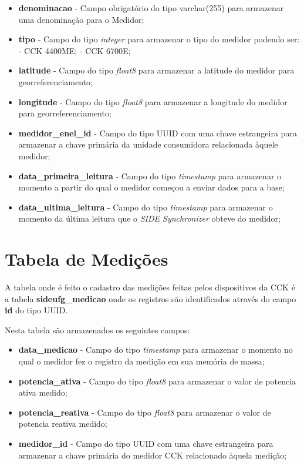 \begin{itemize}
    \item \textbf{denominacao} - Campo obrigatório do tipo varchar(255) para armazenar uma denominação para o Medidor;
    \item \textbf{tipo} - Campo do tipo \textit{integer} para armazenar o tipo do medidor podendo ser:
     - CCK 4400ME;
     - CCK 6700E;
    \item \textbf{latitude} - Campo do tipo \textit{float8} para armazenar a latitude do medidor para georreferenciamento;
    \item \textbf{longitude} - Campo do tipo \textit{float8} para armazenar a longitude do medidor para georreferenciamento;
    \item \textbf{medidor\_enel\_id} - Campo do tipo UUID com uma chave estrangeira para armazenar a chave primária da unidade consumidora relacionada àquele medidor;
    \item \textbf{data\_primeira\_leitura} - Campo do tipo \textit{timestamp} para armazenar o momento a partir do qual o medidor começou a enviar dados para a base;
    \item \textbf{data\_ultima\_leitura} - Campo do tipo \textit{timestamp} para armazenar o momento da última leitura que o \textit{SIDE Synchronizer} obteve do medidor;
    
\end{itemize}

\section{Tabela de Medições}

A tabela onde é feito o cadastro das medições feitas pelos dispositivos da CCK é a tabela \textbf{sideufg\_medicao} onde os registros são identificados através do campo \textbf{id} do tipo UUID.

Nesta tabela são armazenados os seguintes campos:

\begin{itemize}
    \item \textbf{data\_medicao} - Campo do tipo \textit{timestamp} para armazenar o momento no qual o medidor fez o registro da medição em sua memória de massa;
    \item \textbf{potencia\_ativa} - Campo do tipo \textit{float8} para armazenar o valor de potencia ativa medido;
    \item \textbf{potencia\_reativa} - Campo do tipo \textit{float8} para armazenar o valor de potencia reativa medido;
    \item \textbf{medidor\_id} - Campo do tipo UUID com uma chave estrangeira para armazenar a chave primária do medidor CCK relacionado àquela medição;
\end{itemize}


